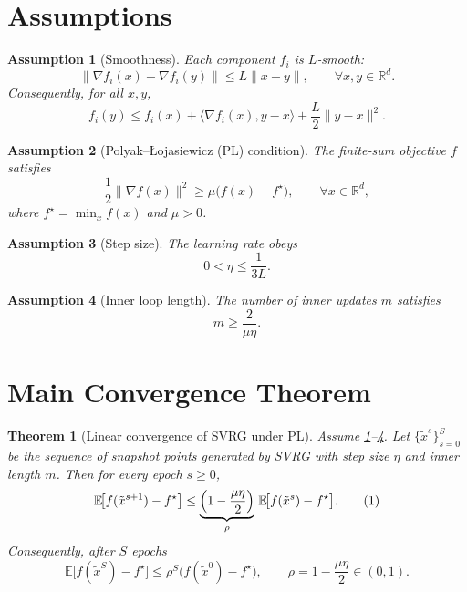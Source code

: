 \documentclass{article}
\newtheorem{theorem}{Theorem}
\newtheorem{assumption}{Assumption}
\newcommand{\E}{\mathbb{E}}
\newcommand{\R}{\mathbb{R}}
\begin{document}
\newpage
\section*{Assumptions}
\begin{assumption}[Smoothness]\label{ass:smooth}
Each component $f_i$ is $L$‑smooth:
\[
\|\nabla f_i(x)-\nabla f_i(y)\|\le L\|x-y\|,\qquad\forall x,y\in\R^{d}.
\]
Consequently, for all $x,y$,
\[
f_i(y)\le f_i(x)+\langle\nabla f_i(x),y-x\rangle+\frac{L}{2}\|y-x\|^{2}.
\tag{A1}
\]
\end{assumption}

\begin{assumption}[Polyak–Łojasiewicz (PL) condition]\label{ass:pl}
The finite‑sum objective $f$ satisfies
\[
\frac{1}{2}\|\nabla f(x)\|^{2}\ge \mu\bigl(f(x)-f^{\star}\bigr),\qquad\forall x\in\R^{d},
\tag{A2}
\]
where $f^{\star}= \min_{x}f(x)$ and $\mu>0$.
\end{assumption}

\begin{assumption}[Step size]\label{ass:step}
The learning rate obeys
\[
0<\eta\le \frac{1}{3L}.
\tag{A3}
\]
\end{assumption}

\begin{assumption}[Inner loop length]\label{ass:inner}
The number of inner updates $m$ satisfies
\[
m\ge \frac{2}{\mu\eta}.
\tag{A4}
\]
\end{assumption}

\section*{Main Convergence Theorem}
\begin{theorem}[Linear convergence of SVRG under PL]\label{thm:linear}
Assume \ref{ass:smooth}–\ref{ass:inner}. Let $\{ \tilde{x}^{s}\}_{s=0}^{S}$ be the sequence of snapshot points generated by SVRG with step size $\eta$ and inner length $m$. Then for every epoch $s\ge 0$,
\[
\E\!\bigl[ f(\tilde{x}^{s+1})-f^{\star}\bigr]\le
\underbrace{\Bigl(1-\frac{\mu\eta}{2}\Bigr)}_{\rho}\,
\E\!\bigl[ f(\tilde{x}^{s})-f^{\star}\bigr].
\tag{1}
\]
Consequently, after $S$ epochs
\[
\E\!\bigl[ f(\tilde{x}^{S})-f^{\star}\bigr]\le \rho^{S}\bigl(f(\tilde{x}^{0})-f^{\star}\bigr),
\qquad \rho=1-\frac{\mu\eta}{2}\in(0,1).
\tag{2}
\]
\end{theorem}
\end{document}
